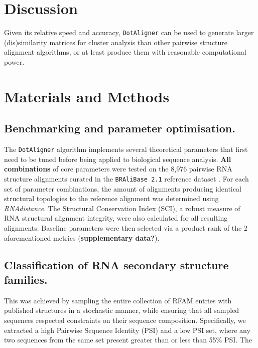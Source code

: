 \documentclass[a4paper,11pt]{article}
\newcommand\dotaligner{\texttt{DotAligner}}
\newcommand\bralibase{\texttt{BRAliBase 2.1}}
\begin{document}
\section*{Discussion}
Given its relative speed and accuracy, \dotaligner{} can be used to generate larger 
(dis)similarity matrices for cluster analysis than other pairwise structure 
alignment algorithms, or at least produce them with reasonable computational 
power.  



\section{ Materials and Methods }
\subsection{ Benchmarking and parameter optimisation. }
The \dotaligner{} algorithm implements several theoretical parameters that first need to 
be tuned before being applied to biological sequence analysis.\textbf{ All combinations} of 
core parameters were tested on the 8,976 pairwise RNA structure alignments curated in the 
\bralibase{} reference dataset \cite{Wilm2006enhanced}. For each set of parameter combinations, 
the amount of alignments producing identical structural topologies to the reference alignment
was determined using \textit{RNAdistance}. The Structural Conservation Index (SCI), a robust 
measure of RNA structural alignment integrity, were  also calculated for all resulting alignments. 
Baseline parameters were then selected via a product rank of the 2 aforementioned metrics 
(\textbf{supplementary data?}).\\

\subsection{ Classification of RNA secondary structure families. }
This was achieved by sampling the entire collection of RFAM entries with published structures 
in a stochastic manner, while ensuring that all sampled sequences respected constraints 
on their sequence composition. Specifically, we extracted a high Pairwise Sequence Identity (PSI) 
and a low PSI set, where any two sequences from the same set present greater than or less than 
55\% PSI. The 
\end{document}
